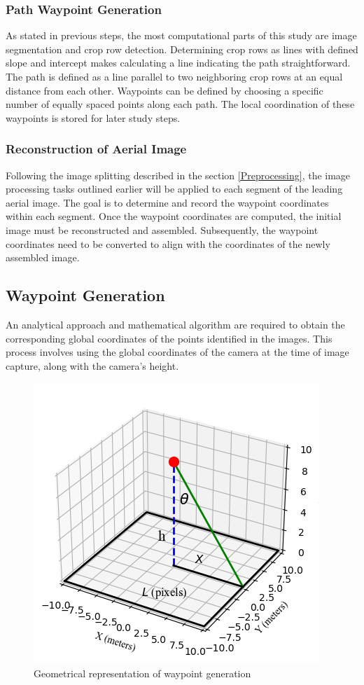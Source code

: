 \documentclass[conference]{IEEEtran}
\begin{document}
	\subsubsection{Path Waypoint Generation}\label{Path Waypoint Generation}\leavevmode
	
	As stated in previous steps, the most computational parts of this study are image segmentation and crop row detection. Determining crop rows as lines with defined slope and intercept makes calculating a line indicating the path straightforward. The path is defined as a line parallel to two neighboring crop rows at an equal distance from each other.
	Waypoints can be defined by choosing a specific number of equally spaced points along each path. The local coordination of these waypoints is stored for later study steps.
	
	\subsubsection{Reconstruction of Aerial Image}\label{Reconstruction of Aerial Image}\leavevmode
	
	Following the image splitting described in the section
	\ref{Preprocessing}, the image processing tasks outlined earlier will be applied to each segment of the leading aerial image. The goal is to determine and record the waypoint coordinates within each segment. Once the waypoint coordinates are computed, the initial image must be reconstructed and assembled. Subsequently, the waypoint coordinates need to be converted to align with the coordinates of the newly assembled image.
	
	\subsection{Waypoint Generation}\label{Waypoint Generation}
	An analytical approach and mathematical algorithm are required to obtain the corresponding global coordinates of the points identified in the images. This process involves using the global coordinates of the camera at the time of image capture, along with the camera's height.
	
	\begin{figure}[t]
		\centering
		\includegraphics[width=0.6\linewidth]{waypoint_geometry}
		\caption{Geometrical representation of waypoint generation}
		\label{fig:waypointgeometry}
	\end{figure}
	
\end{document}
